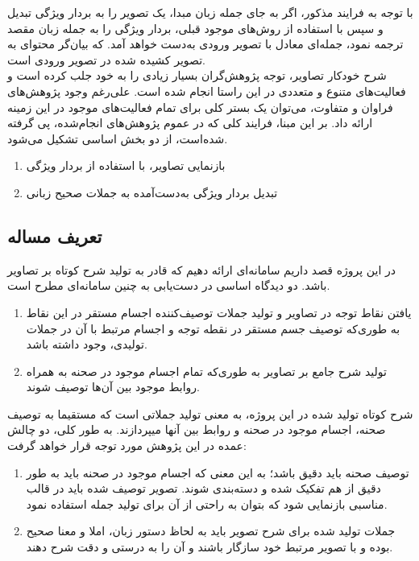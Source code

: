 با توجه به فرایند مذکور، اگر به جای جمله زبان مبدا، یک تصویر را به بردار ویژگی تبدیل و سپس با استفاده از روش‌های موجود قبلی، بردار ویژگی را به جمله زبان مقصد ترجمه نمود، جمله‌ای معادل با تصویر ورودی به‌دست خواهد آمد. که بیان‌گر محتوای به تصویر کشیده شده در تصویر ورودی است.
\\
شرح خودکار تصاویر، توجه پژوهش‌گران بسیار زیادی را به خود جلب کرده است و فعالیت‌های متنوع و متعددی در این راستا انجام شده است. علی‌رغم وجود پژوهش‌‌های فراوان و متفاوت، می‌توان یک بستر کلی برای تمام فعالیت‌های موجود در این زمینه ارائه داد. بر این مبنا، فرایند کلی که در عموم پژوهش‌های انجام‌شده، پی گرفته شده‌است، از دو بخش اساسی تشکیل می‌شود.
\begin{enumerate}
\item بازنمایی تصاویر، با استفاده از بردار ویژگی
\item تبدیل بردار ويژگی به‌دست‌آمده به جملات صحیح زبانی
\end{enumerate}


\subsection{تعریف مساله}
در این پروژه قصد داریم سامانه‌ای ارائه دهیم که قادر به تولید شرح کوتاه بر تصاویر باشد. دو دیدگاه اساسی در دست‌یابی به چنین سامانه‌ای مطرح است.
\begin{enumerate}
\item
 یافتن نقاط توجه 
در تصاویر و تولید جملات توصیف‌کننده اجسام مستقر در این نقاط به طوری‌که توصیف جسم مستقر در نقطه توجه و اجسام مرتبط با آن در جملات تولیدی، وجود داشته باشد.
\item  تولید شرح جامع بر تصاویر به طوری‌که تمام اجسام موجود در صحنه به همراه روابط موجود بین آن‌ها توصیف شوند. 
\end{enumerate}

شرح کوتاه تولید شده در این پروژه، به معنی تولید جملاتی است که مستقیما به توصیف صحنه، اجسام موجود در صحنه و روابط بین آن­ها می­پردازند.
به طور کلی، دو چالش عمده در این پژوهش مورد توجه قرار خواهد گرفت:
\begin{enumerate}
\item  توصیف صحنه باید دقیق باشد؛ به این معنی که اجسام موجود در صحنه باید به طور دقیق از هم تفکیک شده و دسته‌بندی شوند. تصویر توصیف شده باید در قالب مناسبی بازنمایی شود که بتوان به راحتی از آن برای تولید جمله استفاده نمود.
\item  جملات تولید شده برای شرح تصویر باید به لحاظ دستور زبان، املا و معنا صحیح بوده و با تصویر مرتبط خود سازگار باشند و آن را به درستی و دقت شرح دهند.
\end{enumerate}

